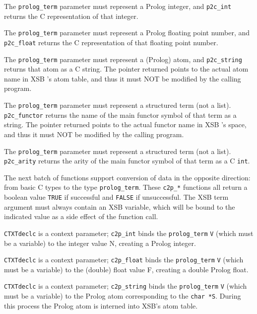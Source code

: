 \begin{description}
%
The {\tt prolog\_term} parameter must represent a Prolog integer, and
{\tt p2c\_int} returns the C representation of that integer.

%
The {\tt prolog\_term} parameter must represent a Prolog floating point
number, and {\tt p2c\_float} returns the C representation of
that floating point number.

%
The {\tt prolog\_term} parameter must represent a (Prolog) atom, and
{\tt p2c\_string} returns that atom as a C string. The pointer
returned points to the actual atom name in XSB 's atom table, and thus
it must NOT be modified by the calling program.

%
The {\tt prolog\_term} parameter must represent a structured term (not a
list).  {\tt p2c\_functor} returns the name of the main
functor symbol of that term as a string. The pointer returned points
to the actual functor name in XSB 's space, and thus it must NOT be
modified by the calling program.

%
The {\tt prolog\_term} parameter must represent a structured term (not
a list).  {\tt p2c\_arity} returns the arity of the main
functor symbol of that term as a C {\tt int}.
\end{description}

The next batch of functions support conversion of data in the opposite
direction: from basic C types to the type {\tt prolog\_term}.  These
{\tt c2p\_*} functions all return a boolean value {\tt TRUE}
if successful and {\tt FALSE} if unsuccessful.  The XSB term argument
must always contain an XSB variable, which will be bound to the
indicated value as a side effect of the function call.

\begin{description}
%
 {\tt CTXTdeclc} is a context parameter; {\tt c2p\_int} binds the
 {\tt prolog\_term} {\tt V} (which must be a variable) to the integer
 value N, creating a Prolog integer.

%
 {\tt CTXTdeclc} is a context parameter; {\tt c2p\_float} binds the
 {\tt prolog\_term} {\tt V} (which must be a variable) to the (double)
 float value F, creating a double Prolog float.

%
 {\tt CTXTdeclc} is a context parameter; {\tt c2p\_string} binds the
 {\tt prolog\_term} {\tt V} (which must be a variable) to the Prolog
 atom corresponding to the {\tt char *S}.  During this process the
 Prolog atom is interned into XSB's atom table.
\end{description}

